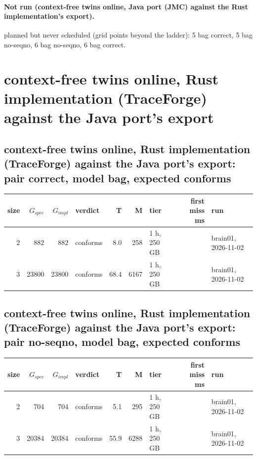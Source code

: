 \documentclass[10pt]{article}
\begin{document}
\paragraph{Not run (context-free twins online, Java port (JMC) against the Rust implementation's export).}
planned but never scheduled (grid points beyond the ladder): 5 bag correct, 5 bag no-seqno, 6 bag no-seqno, 6 bag correct.\par
\section*{context-free twins online, Rust implementation (TraceForge) against the Java port's export}
\subsection*{context-free twins online, Rust implementation (TraceForge) against the Java port's export: pair \textsf{correct}, model bag, expected conforms}
\begin{longtable}{@{}rrrlrrlrl@{}}
\toprule
size & $G_{\mathit{spec}}$ & $G_{\mathit{impl}}$ & verdict & T & M & tier & first miss ms & run \\
\midrule
\endhead
\color{red} 2 & 882 & 882 & conforms & 8.0 & 258 & 1 h, 250 GB &  & brain01, 2026-11-02 \\
\color{red} 3 & 23800 & 23800 & conforms & 68.4 & 6167 & 1 h, 250 GB &  & brain01, 2026-11-02 \\
\bottomrule
\end{longtable}
\subsection*{context-free twins online, Rust implementation (TraceForge) against the Java port's export: pair \textsf{no-seqno}, model bag, expected conforms}
\begin{longtable}{@{}rrrlrrlrl@{}}
\toprule
size & $G_{\mathit{spec}}$ & $G_{\mathit{impl}}$ & verdict & T & M & tier & first miss ms & run \\
\midrule
\endhead
\color{red} 2 & 704 & 704 & conforms & 5.1 & 295 & 1 h, 250 GB &  & brain01, 2026-11-02 \\
\color{red} 3 & 20384 & 20384 & conforms & 55.9 & 6288 & 1 h, 250 GB &  & brain01, 2026-11-02 \\
\bottomrule
\end{longtable}
\end{document}
